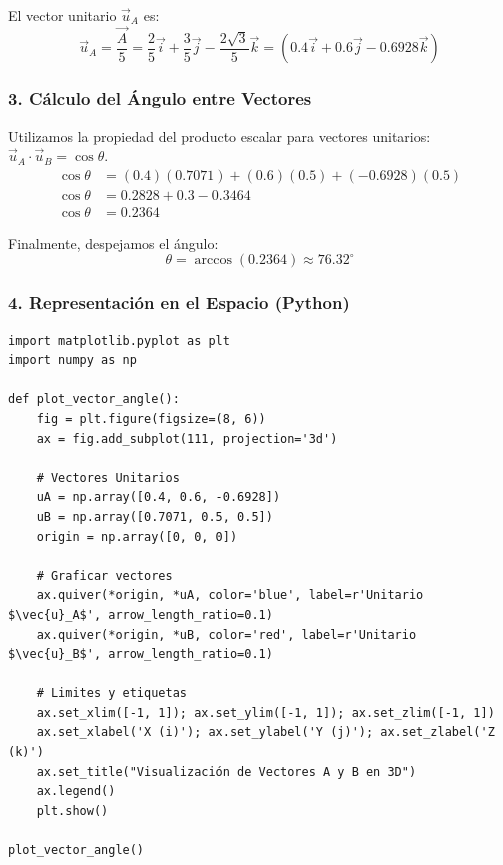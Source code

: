 \documentclass[12pt, a4paper]{article}
\begin{document}
El vector unitario $\vec{u}_A$ es:
\begin{equation*}
    \vec{u}_A = \frac{\vec{A}}{5} = \frac{2}{5}\vec{i} + \frac{3}{5}\vec{j} - \frac{2\sqrt{3}}{5}\vec{k} = (0.4\vec{i} + 0.6\vec{j} - 0.6928\vec{k})
\end{equation*}

\subsubsection*{3. Cálculo del Ángulo entre Vectores}
Utilizamos la propiedad del producto escalar para vectores unitarios: $\vec{u}_A \cdot \vec{u}_B = \cos \theta$.
\begin{align*}
    \cos \theta &= (0.4)(0.7071) + (0.6)(0.5) + (-0.6928)(0.5) \\
    \cos \theta &= 0.2828 + 0.3 - 0.3464 \\
    \cos \theta &= 0.2364
\end{align*}

Finalmente, despejamos el ángulo:
\begin{equation*}
    \theta = \arccos(0.2364) \approx 76.32^\circ
\end{equation*}

\subsubsection*{4. Representación en el Espacio (Python)}


\begin{lstlisting}
import matplotlib.pyplot as plt
import numpy as np

def plot_vector_angle():
    fig = plt.figure(figsize=(8, 6))
    ax = fig.add_subplot(111, projection='3d')
    
    # Vectores Unitarios
    uA = np.array([0.4, 0.6, -0.6928])
    uB = np.array([0.7071, 0.5, 0.5])
    origin = np.array([0, 0, 0])
    
    # Graficar vectores
    ax.quiver(*origin, *uA, color='blue', label=r'Unitario $\vec{u}_A$', arrow_length_ratio=0.1)
    ax.quiver(*origin, *uB, color='red', label=r'Unitario $\vec{u}_B$', arrow_length_ratio=0.1)
    
    # Limites y etiquetas
    ax.set_xlim([-1, 1]); ax.set_ylim([-1, 1]); ax.set_zlim([-1, 1])
    ax.set_xlabel('X (i)'); ax.set_ylabel('Y (j)'); ax.set_zlabel('Z (k)')
    ax.set_title("Visualización de Vectores A y B en 3D")
    ax.legend()
    plt.show()

plot_vector_angle()
\end{lstlisting}
\end{document}
